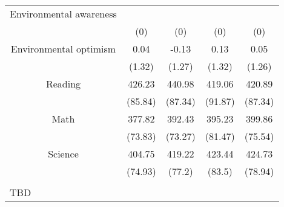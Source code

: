 \begin{table}[!htbp]
\begin{tabular}{@{\extracolsep{5pt}} ccccc}
Environmental awareness &  &  &  &  \\ 
 & (0) & (0) & (0) & (0) \\ 
Environmental optimism &  0.04 & -0.13 &  0.13 &  0.05 \\ 
 & (1.32) & (1.27) & (1.32) & (1.26) \\ 
Reading & 426.23 & 440.98 & 419.06 & 420.89 \\ 
 & (85.84) & (87.34) & (91.87) & (87.34) \\ 
Math & 377.82 & 392.43 & 395.23 & 399.86 \\ 
 & (73.83) & (73.27) & (81.47) & (75.54) \\ 
Science & 404.75 & 419.22 & 423.44 & 424.73 \\ 
 & (74.93) & (77.2) & (83.5) & (78.94) \\ 
\hline \\[-1.8ex] 
\multicolumn{5}{l}{TBD} \\ 
\end{tabular} 
\end{table} 
